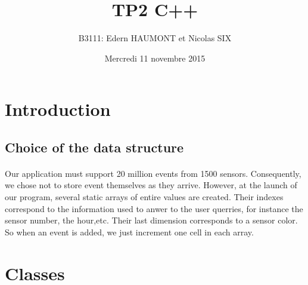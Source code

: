 \documentclass[a4paper, 12pts]{article}
\title{TP2 C++}
\author{B3111: Edern HAUMONT et Nicolas SIX}
\date{Mercredi 11 novembre 2015}
\begin{document}
\begin{titlepage}

\maketitle

\end{titlepage}


\tableofcontents

\pagebreak



\section{Introduction}
\paragraph{}

\subsection{Choice of the data structure}
\paragraph{}
Our application must support 20 million events from 1500 sensors. Consequently, we chose not to store event themselves as they arrive. However, at the launch of our program, several static arrays of entire values are created. Their indexes correspond to the information used to anwer to the user querries, for instance the sensor number, the hour,etc. Their last dimension corresponds to a sensor color. So when an event is added, we just increment one cell in each array.

\section{Classes}
\end{document}
